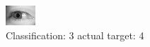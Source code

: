 \begin{figure}[h!]
\begin{center}
\includegraphics[width=0.60\columnwidth]{figures/ID3115_class_3_target_4.png}
\end{center}
\caption{ Classification: 3 actual target: 4}
\label{fig:ID3115_class_3_target_4}
\end{figure}
